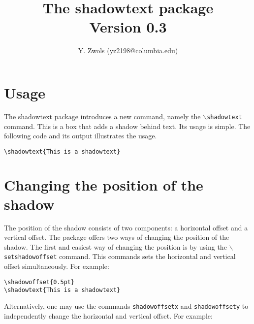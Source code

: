 \documentclass{article}
\begin{document}
\title{\bf The shadowtext package \\ \bigskip \normalfont\small Version 0.3}
\author{Y. Zwols (yz2198@columbia.edu)}
\maketitle

\shadowoffset{1pt}
\parindent=0pt
\parskip=8pt

\section{Usage}
The shadowtext package introduces a new command, namely the {\tt $\backslash$shadowtext} command. This is a box
that adds a shadow behind text. Its usage is simple. The following code and its output illustrates the usage. 

\begin{minipage}{\textwidth}
\begin{multicols*}{2} 
{\footnotesize
\begin{verbatim}
\shadowtext{This is a shadowtext}
\end{verbatim}}

\end{multicols*}
\end{minipage}

\section{Changing the position of the shadow}
The position of the shadow consists of two components: a horizontal offset and a vertical offset. 
The package offers two ways of changing the position of the shadow. The first and easiest way of 
changing the position is by using the {\tt $\backslash$setshadowoffset} command. This commands
sets the horizontal and vertical offset simultaneously. For example:

\begin{minipage}{\textwidth}
\begin{multicols*}{2} 
{\footnotesize
\begin{verbatim}
\shadowoffset{0.5pt}
\shadowtext{This is a shadowtext}
\end{verbatim}}

\shadowoffset{0.5pt}
\end{multicols*}
\end{minipage}

Alternatively, one may use the commands {\tt shadowoffsetx} and {\tt shadowoffsety} to independently change
the horizontal and vertical offset. For example:
\end{document}
